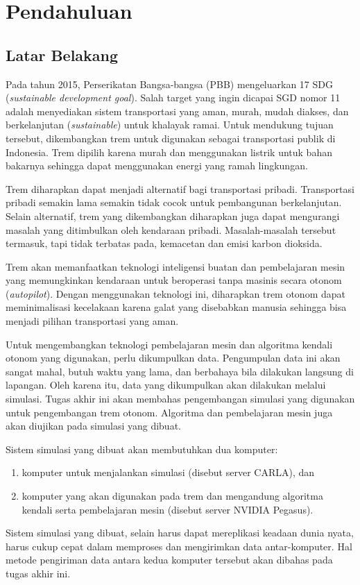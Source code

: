 \chapter{Pendahuluan}

\section{Latar Belakang}

Pada tahun 2015, Perserikatan Bangsa-bangsa (PBB) mengeluarkan 17 SDG
(\textit{sustainable development goal}). Salah target yang ingin dicapai SGD
nomor 11 adalah menyediakan sistem transportasi yang aman, murah, mudah diakses,
dan berkelanjutan (\textit{sustainable}) untuk khalayak ramai. Untuk mendukung
tujuan tersebut, dikembangkan trem untuk digunakan sebagai transportasi publik
di Indonesia. Trem dipilih karena murah dan menggunakan listrik untuk bahan
bakarnya sehingga dapat menggunakan energi yang ramah lingkungan.

Trem diharapkan dapat menjadi alternatif bagi transportasi pribadi. Transportasi
pribadi semakin lama semakin tidak cocok untuk pembangunan berkelanjutan. Selain
alternatif, trem yang dikembangkan diharapkan juga dapat mengurangi masalah yang
ditimbulkan oleh kendaraan pribadi. Masalah-masalah tersebut termasuk, tapi
tidak terbatas pada, kemacetan dan emisi karbon dioksida.

Trem akan memanfaatkan teknologi inteligensi buatan dan pembelajaran mesin yang
memungkinkan kendaraan untuk beroperasi tanpa masinis secara otonom
(\textit{autopilot}). Dengan menggunakan teknologi ini, diharapkan trem otonom
dapat meminimalisasi kecelakaan karena galat yang disebabkan manusia sehingga
bisa menjadi pilihan transportasi yang aman.

Untuk mengembangkan teknologi pembelajaran mesin dan algoritma kendali otonom
yang digunakan, perlu dikumpulkan data. Pengumpulan data ini akan sangat mahal,
butuh waktu yang lama, dan berbahaya bila dilakukan langsung di lapangan. Oleh
karena itu, data yang dikumpulkan akan dilakukan melalui simulasi. Tugas akhir
ini akan membahas pengembangan simulasi yang digunakan untuk pengembangan trem
otonom. Algoritma dan pembelajaran mesin juga akan diujikan pada simulasi yang
dibuat.

Sistem simulasi yang dibuat akan membutuhkan dua komputer:
\begin{enumerate}
	\item komputer untuk menjalankan simulasi (disebut server CARLA), dan
	\item komputer yang akan digunakan pada trem dan mengandung algoritma
	      kendali serta pembelajaran mesin (disebut server NVIDIA Pegasus).
\end{enumerate}
Sistem simulasi yang dibuat, selain harus dapat mereplikasi keadaan dunia nyata,
harus cukup cepat dalam memproses dan mengirimkan data antar-komputer. Hal
metode pengiriman data antara kedua komputer tersebut akan dibahas pada tugas
akhir ini.

